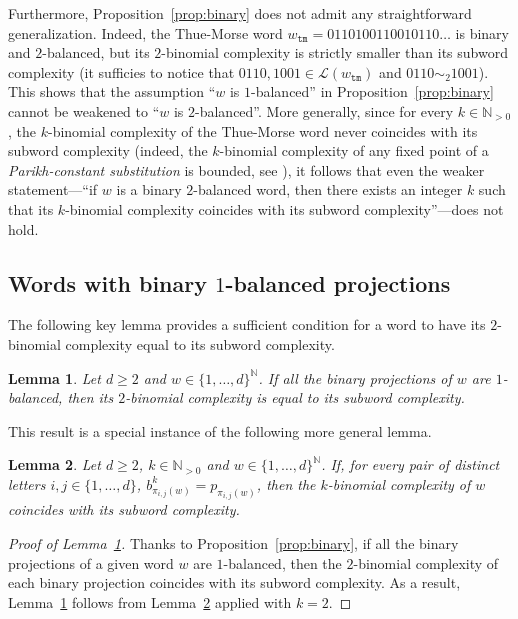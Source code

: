 \documentclass{template_arxiv}
\newtheorem{lemma}{Lemma}%
\theoremstyle{definition}
\newcommand{\N}{\mathbb{N}}
\newcommand{\lan}{\mathcal{L}}
\begin{document}
Furthermore, Proposition~\ref{prop:binary} does not admit any straightforward generalization. Indeed, the Thue-Morse word $w_{\mathtt{tm}}=0110100110010110\ldots$ is binary and $2$-balanced, but its $2$-binomial complexity is strictly smaller than its subword complexity (it sufficies to notice that $0110,1001\in\lan(w_{\mathtt{tm}})$ and $0110\sim_2 1001$). This shows that the assumption ``$w$ is $1$-balanced'' in Proposition~\ref{prop:binary} cannot be weakened to ``$w$ is $2$-balanced''. More generally, since for every $k\in\N_{>0}$, the $k$-binomial complexity of the Thue-Morse word never coincides with its subword complexity (indeed, the $k$-binomial complexity of any fixed point of a \emph{Parikh-constant substitution} is bounded, see \cite[Theorem~13]{RS15}), it follows that even the weaker statement---``if $w$ is a binary $2$-balanced word, then there exists an integer $k$ such that its $k$-binomial complexity coincides with its subword complexity''---does not hold.

\subsection{Words with binary $1$-balanced projections}

The following key lemma provides a sufficient condition for a word to have its $2$-binomial complexity equal to its subword complexity.

\begin{lemma}\label{lemma:binary_projections}
Let $d\geq 2$ and $w\in\{1,\ldots,d\}^\N$. If all the binary projections of $w$ are $1$-balanced, then its $2$-binomial complexity is equal to its subword complexity.
\end{lemma}

This result is a special instance of the following more general lemma.

\begin{lemma}\label{lemma:projections_kbin}
Let $d\geq 2$, $k\in\N_{>0}$ and $w\in\{1,\ldots,d\}^\N$. If, for every pair of distinct letters $i,j\in\{1,\ldots,d\}$, $b_{\pi_{i,j}(w)}^k=p_{\pi_{i,j}(w)}$, then the $k$-binomial complexity of $w$ coincides with its subword complexity.
\end{lemma}

\begin{proof}[Proof of Lemma~\ref{lemma:binary_projections}]
Thanks to Proposition~\ref{prop:binary}, if all the binary projections of a given word $w$ are $1$-balanced, then the $2$-binomial complexity of each binary projection coincides with its subword complexity. As a result, Lemma~\ref{lemma:binary_projections} follows from Lemma~\ref{lemma:projections_kbin} applied with $k=2$.
\end{proof}
\end{document}
